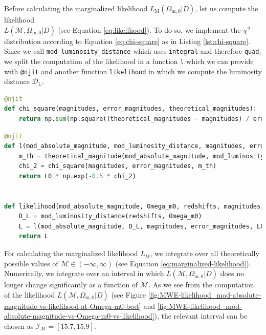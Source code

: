 \noindent Before calculating the marginalized likelihood $L_{\text{M}}(\Omega_{\text{m},0} \vert D)$, let us compute the likelihood \\
$L(\mathcal{M}, \Omega_{\text{m},0} \vert D)$ (see Equation \ref{eq:likelihood}). To do so, we implement the $\chi^2$-distribution according to Equation \ref{eq:chi-square} as in Listing \ref{lst:chi-square}. Since we call \colorbox{backcolor}{\lstinline{mod_luminosity_distance}} which uses \colorbox{backcolor}{\lstinline{integral}} and therefore \colorbox{backcolor}{\lstinline{quad}}, we split the computation of the likelihood in a function \colorbox{backcolor}{\lstinline{l}} which we can provide with \colorbox{backcolor}{\lstinline{@njit}} and another function \colorbox{backcolor}{\lstinline{likelihood}} in which we compute the luminosity distance $\mathcal{D}_{\text{L}}$. 

\begin{lstlisting}[language=Python, caption={Function for $\chi^2(\mathcal{M}, \Omega_{\text{m},0} \vert D)$.}, label={lst:chi-square}]
@njit
def chi_square(magnitudes, error_magnitudes, theoretical_magnitudes):
    return np.sum(np.square((theoretical_magnitudes - magnitudes) / error_magnitudes))

\end{lstlisting}

\begin{lstlisting}[language=Python, caption={Functions for the likelihood $L(\mathcal{M}, \Omega_{\text{m},0} \vert D)$.}, label={lst:likelihood}]
@njit
def l(mod_absolute_magnitude, mod_luminosity_distance, magnitudes, error_magnitudes, L0):
    m_th = theoretical_magnitude(mod_absolute_magnitude, mod_luminosity_distance)
    chi_2 = chi_square(magnitudes, error_magnitudes, m_th)
    return L0 * np.exp(-0.5 * chi_2)


def likelihood(mod_absolute_magnitude, Omega_m0, redshifts, magnitudes, error_magnitudes, L0):
    D_L = mod_luminosity_distance(redshifts, Omega_m0)
    L = l(mod_absolute_magnitude, D_L, magnitudes, error_magnitudes, L0)
    return L
\end{lstlisting}

\noindent For calculating the marginalized likelihood $L_{\text{M}}$, we integrate over all theoretically possible values of $\mathcal{M} \in (-\infty, \infty)$ (see Equation \ref{eq:marginalized-likelihood}). Numerically, we integrate over an interval in which $L(\mathcal{M}, \Omega_{\text{m},0} \vert D)$ does no longer change significantly as a function of $\mathcal{M}$. As we see from the computation of the likelihood $L(\mathcal{M}, \Omega_{\text{m},0} \vert D)$ (see Figure \ref{fig:MWE-likelihood_mod-absolute-magnitude-vs-likelihood-at-Omega-m0-best} and \ref{fig:MWE-likelihood_mod-absolute-magnitude-vs-Omega-m0-vs-likelihood}), the relevant interval can be chosen as $\mathcal{I}_{\mathcal{M}} = [15.7, 15.9]$. 

